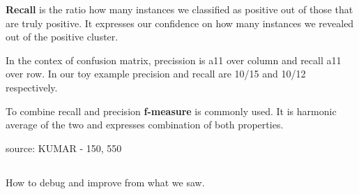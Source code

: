 {\bf Recall} is the ratio how many instances we classified as positive out of those that are truly positive.
It expresses our confidence on how many instances we revealed out of the positive cluster.

In the contex of confusion matrix, precission is a11 over column and recall a11 over row. In our toy example precision and recall are 10/15 and 10/12 respectively.

To combine recall and precision {\bf f-measure} is commonly used.
It is harmonic average of the two and expresses combination of both properties.



{source: KUMAR - 150, 550}




\subsection{}

\subsection{}

How to debug and improve from what we saw.

\subsection{}
